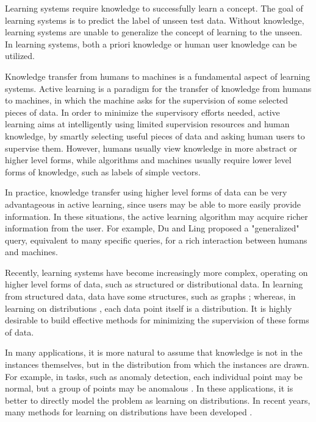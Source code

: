 \documentclass[10pt,twocolumn]{IEEEtran}
\begin{document}
	Learning systems require knowledge to successfully learn a concept. The goal of learning systems is to predict the label of unseen test data. Without knowledge, learning systems are unable to generalize the concept of learning to the unseen. In learning systems, both a priori knowledge or human user knowledge can be utilized.
	
	Knowledge transfer from humans to machines is a fundamental aspect of learning systems. Active learning is a paradigm for the transfer of knowledge from humans to machines, in which the machine asks for the supervision of some selected pieces of data. In order to minimize the supervisory efforts needed, active learning aims at intelligently using limited supervision resources and human knowledge, by smartly selecting useful pieces of data and asking human users to supervise them. However, humans usually view knowledge in more abstract or higher level forms, while algorithms and machines usually require lower level forms of knowledge, such as labels of simple vectors.
	
	In practice, knowledge transfer using higher level forms of data can be very advantageous in active learning, since users may be able to more easily provide information. In these situations, the active learning algorithm may acquire richer information from the user. For example, Du and Ling \cite{du2010asking} proposed a "generalized" query, equivalent to many specific queries, for a rich interaction between humans and machines.
	
	Recently, learning systems have become increasingly more complex, operating on higher level forms of data, such as structured or distributional data. In learning from structured data, data have some structures, such as graphs \cite{getoor2003learning}; whereas, in learning on distributions \cite{muandet2012learning}, each data point itself is a distribution. It is highly desirable to build effective methods for minimizing the supervision of these forms of data.
	
	In many applications, it is more natural to assume that knowledge is not in the instances themselves, but in the distribution from which the instances are drawn. For example, in tasks, such as anomaly detection, each individual point may be normal, but a group of points may be anomalous \cite{poczos2012support}. In these applications, it is better to directly model the problem as learning on distributions. In recent years, many methods for learning on distributions have been developed \cite{xiong2014learning, oliva2014fast, muandet2017kernel, szabo2016learning}.
	
\end{document}
